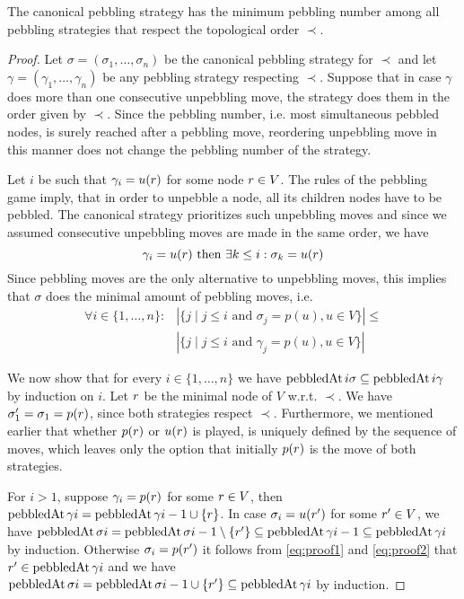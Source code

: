 \begin{theorem}
\label{theorem:canonical}
The canonical pebbling strategy has the minimum pebbling number among all pebbling strategies that respect the topological order $\prec$.
\end{theorem}
\begin{proof}
Let $\sigma = (\sigma_1,\ldots,\sigma_n)$ be the canonical pebbling strategy for $\prec$ and let $\gamma = (\gamma_1,\ldots,\gamma_n)$ be any pebbling strategy respecting $\prec$.
Suppose that in case $\gamma$ does more than one consecutive unpebbling move, the strategy does them in the order given by $\prec$.
Since the pebbling number, i.e. most simultaneous pebbled nodes, is surely reached after a pebbling move, reordering unpebbling move in this manner does not change the pebbling number of the strategy.

Let $i$ be such that $\gamma_i = u(r)$ for some node $r \in V$.
The rules of the pebbling game imply, that in order to unpebble a node, all its children nodes have to be pebbled.
The canonical strategy prioritizes such unpebbling moves and since we assumed consecutive unpebbling moves are made in the same order, we have 
\begin{equation}
	\label{eq:proof1}
 \gamma_i = u(r) \text{ then }\exists k \leq i: \sigma_k = u(r)
\end{equation}
Since pebbling moves are the only alternative to unpebbling moves, this implies that $\sigma$ does the minimal amount of pebbling moves, 
i.e. 
\begin{equation}
	\label{eq:proof2}
	\begin{split}
	\forall i \in \{1,\ldots,n\}: &|\{j \mid j \leq i \text{ and }\sigma_j = p(u), u \in V\}| \leq \\
	&|\{j \mid j \leq i \text{ and }\gamma_j = p(u), u \in V\}|
	\end{split}
\end{equation}

We now show that for every $i \in \{1,\ldots,n\}$ we have $\operatorname{pebbledAt}{i}{\sigma} \subseteq \operatorname{pebbledAt}{i}{\gamma}$ by induction on $i$.
Let $r$ be the minimal node of $V$ w.r.t. $\prec$.
We have $\sigma_1' = \sigma_1 = p(r)$, since both strategies respect $\prec$.
Furthermore, we mentioned earlier that whether $p(r)$ or $u(r)$ is played, is uniquely defined by the sequence of moves, which leaves only the option that initially $p(r)$ is the move of both strategies.

For $i > 1$, suppose $\gamma_i = p(r)$ for some $r \in V$, then $\operatorname{pebbledAt}{\gamma}{i} = \operatorname{pebbledAt}{\gamma}{i-1} \cup \{r\}$.
In case $\sigma_i = u(r')$ for some $r' \in V$, we have $\operatorname{pebbledAt}{\sigma}{i} = \operatorname{pebbledAt}{\sigma}{i-1} \setminus \{r'\} \subseteq \operatorname{pebbledAt}{\gamma}{i-1} \subseteq \operatorname{pebbledAt}{\gamma}{i}$ by induction.
Otherwise $\sigma_i = p(r')$ it follows from \ref{eq:proof1} and \ref{eq:proof2} that $r' \in \operatorname{pebbledAt}{\gamma}{i}$ and we have $\operatorname{pebbledAt}{\sigma}{i} = \operatorname{pebbledAt}{\sigma}{i-1} \cup \{r'\} \subseteq \operatorname{pebbledAt}{\gamma}{i}$ by induction.


\end{proof}
